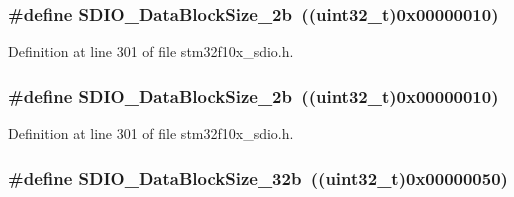 \subsubsection[{\texorpdfstring{S\+D\+I\+O\+\_\+\+Data\+Block\+Size\+\_\+2b}{SDIO_DataBlockSize_2b}}]{\setlength{\rightskip}{0pt plus 5cm}\#define S\+D\+I\+O\+\_\+\+Data\+Block\+Size\+\_\+2b~(({\bf uint32\+\_\+t})0x00000010)}\hypertarget{group___s_d_i_o___data___block___size_ga7209d9d52635b66df85712c6fcd668ea}{}\label{group___s_d_i_o___data___block___size_ga7209d9d52635b66df85712c6fcd668ea}


Definition at line 301 of file stm32f10x\+\_\+sdio.\+h.

\subsubsection[{\texorpdfstring{S\+D\+I\+O\+\_\+\+Data\+Block\+Size\+\_\+2b}{SDIO_DataBlockSize_2b}}]{\setlength{\rightskip}{0pt plus 5cm}\#define S\+D\+I\+O\+\_\+\+Data\+Block\+Size\+\_\+2b~(({\bf uint32\+\_\+t})0x00000010)}\hypertarget{group___s_d_i_o___data___block___size_ga7209d9d52635b66df85712c6fcd668ea}{}\label{group___s_d_i_o___data___block___size_ga7209d9d52635b66df85712c6fcd668ea}


Definition at line 301 of file stm32f10x\+\_\+sdio.\+h.

\subsubsection[{\texorpdfstring{S\+D\+I\+O\+\_\+\+Data\+Block\+Size\+\_\+32b}{SDIO_DataBlockSize_32b}}]{\setlength{\rightskip}{0pt plus 5cm}\#define S\+D\+I\+O\+\_\+\+Data\+Block\+Size\+\_\+32b~(({\bf uint32\+\_\+t})0x00000050)}\hypertarget{group___s_d_i_o___data___block___size_gad0f89aa989c0cedf8d69eb28548413ca}{}\label{group___s_d_i_o___data___block___size_gad0f89aa989c0cedf8d69eb28548413ca}


